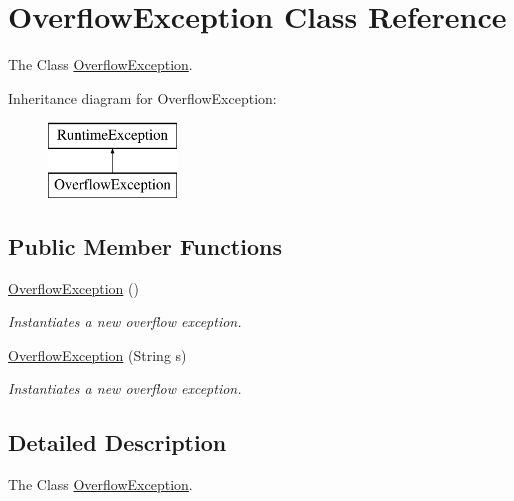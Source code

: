 \hypertarget{class_overflow_exception}{\section{Overflow\+Exception Class Reference}
\label{class_overflow_exception}
}


The Class \hyperlink{class_overflow_exception}{Overflow\+Exception}.  


Inheritance diagram for Overflow\+Exception\+:\begin{figure}[H]
\begin{center}
\leavevmode
\includegraphics[height=2.000000cm]{class_overflow_exception}
\end{center}
\end{figure}
\subsection*{Public Member Functions}
\begin{DoxyCompactItemize}
\item 
\hypertarget{class_overflow_exception_aa443b9a3418c8f5b10f2b7e69d8c38ef}{\hyperlink{class_overflow_exception_aa443b9a3418c8f5b10f2b7e69d8c38ef}{Overflow\+Exception} ()}\label{class_overflow_exception_aa443b9a3418c8f5b10f2b7e69d8c38ef}

\begin{DoxyCompactList}\small\item\em Instantiates a new overflow exception. \end{DoxyCompactList}\item 
\hyperlink{class_overflow_exception_a9769bc5767762ef1c2b8c0e859d20103}{Overflow\+Exception} (String s)
\begin{DoxyCompactList}\small\item\em Instantiates a new overflow exception. \end{DoxyCompactList}\end{DoxyCompactItemize}


\subsection{Detailed Description}
The Class \hyperlink{class_overflow_exception}{Overflow\+Exception}. 

